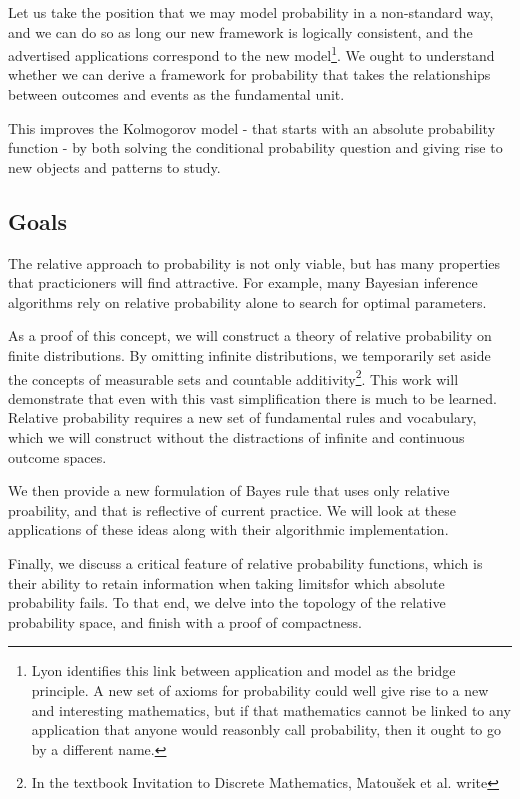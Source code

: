 \documentclass[twoside]{article}
\theoremstyle{plain}%
\theoremstyle{definition}
\theoremstyle{remark}
\begin{document}
Let us take the position that we may model probability in a non-standard way, and we can do so as long our new framework is logically consistent, and the advertised applications correspond to the new model\footnote{Lyon identifies this link between application and model as the bridge principle. A new set of axioms for probability could well give rise to a new and interesting mathematics, but if that mathematics cannot be linked to any application that anyone would reasonbly call probability, then it ought to go by a different name.}. We ought to understand whether we can derive a framework for probability that takes the relationships between outcomes and events as the fundamental unit.

This improves the Kolmogorov model - that starts with an absolute probability function - by both solving the conditional probability question and giving rise to new objects and patterns to study. 

\subsection{Goals}

The relative approach to probability is not only viable, but has many properties that practicioners will find attractive. For example, many Bayesian inference algorithms rely on relative probability alone to search for optimal parameters. 

As a proof of this concept, we will construct a theory of relative probability on finite distributions. By omitting infinite distributions, we temporarily set aside the concepts of measurable sets and countable additivity\footnote{In the textbook Invitation to Discrete Mathematics, Matoušek et al. write }. This work will demonstrate that even with this vast simplification there is much to be learned. Relative probability requires a new set of fundamental rules and vocabulary, which we will construct without the distractions of infinite and continuous outcome spaces.

We then provide a new formulation of Bayes rule that uses only relative proability, and that is reflective of current practice. We will look at these applications of these ideas along with their algorithmic implementation.

Finally, we discuss a critical feature of relative probability functions,
which is their ability to retain information when taking limits\textemdash for which absolute probability fails. To that end, we delve into the topology of the relative probability space, and finish with a proof of compactness.
\end{document}
